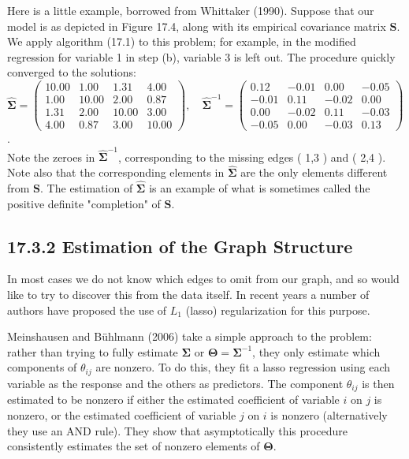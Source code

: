 \documentclass[10pt]{article}
\begin{document}
Here is a little example, borrowed from Whittaker (1990). Suppose that our model is as depicted in Figure 17.4, along with its empirical covariance matrix $\mathbf{S}$. We apply algorithm (17.1) to this problem; for example, in the modified regression for variable 1 in step (b), variable 3 is left out. The procedure quickly converged to the solutions:\\
$\hat{\boldsymbol{\Sigma}}=\left(\begin{array}{cccc}10.00 & 1.00 & 1.31 & 4.00 \\ 1.00 & 10.00 & 2.00 & 0.87 \\ 1.31 & 2.00 & 10.00 & 3.00 \\ 4.00 & 0.87 & 3.00 & 10.00\end{array}\right), \quad \hat{\boldsymbol{\Sigma}}^{-1}=\left(\begin{array}{cccc}0.12 & -0.01 & 0.00 & -0.05 \\ -0.01 & 0.11 & -0.02 & 0.00 \\ 0.00 & -0.02 & 0.11 & -0.03 \\ -0.05 & 0.00 & -0.03 & 0.13\end{array}\right)$.\\
Note the zeroes in $\hat{\boldsymbol{\Sigma}}^{-1}$, corresponding to the missing edges ( 1,3 ) and ( 2,4 ). Note also that the corresponding elements in $\hat{\boldsymbol{\Sigma}}$ are the only elements different from $\mathbf{S}$. The estimation of $\hat{\boldsymbol{\Sigma}}$ is an example of what is sometimes called the positive definite "completion" of $\mathbf{S}$.

\subsection*{17.3.2 Estimation of the Graph Structure}
In most cases we do not know which edges to omit from our graph, and so would like to try to discover this from the data itself. In recent years a number of authors have proposed the use of $L_{1}$ (lasso) regularization for this purpose.

Meinshausen and Bühlmann (2006) take a simple approach to the problem: rather than trying to fully estimate $\boldsymbol{\Sigma}$ or $\boldsymbol{\Theta}=\boldsymbol{\Sigma}^{-1}$, they only estimate which components of $\theta_{i j}$ are nonzero. To do this, they fit a lasso regression using each variable as the response and the others as predictors. The component $\theta_{i j}$ is then estimated to be nonzero if either the estimated coefficient of variable $i$ on $j$ is nonzero, or the estimated coefficient of variable $j$ on $i$ is nonzero (alternatively they use an AND rule). They show that asymptotically this procedure consistently estimates the set of nonzero elements of $\boldsymbol{\Theta}$.
\end{document}
